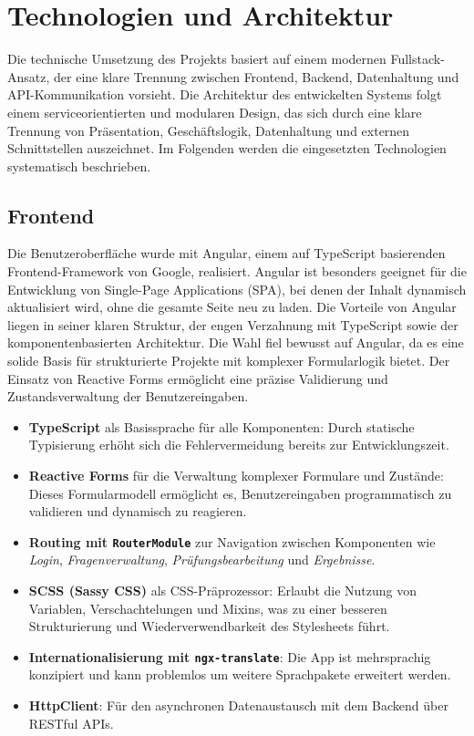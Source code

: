 \documentclass[a4paper,12pt]{article}
\begin{document}
\newpage

\section{Technologien und Architektur}
Die technische Umsetzung des Projekts basiert auf einem modernen Fullstack-Ansatz, der eine klare Trennung zwischen Frontend, Backend, Datenhaltung und API-Kommunikation vorsieht. Die Architektur des entwickelten Systems folgt einem serviceorientierten und modularen Design, das sich durch eine klare Trennung von Präsentation, Geschäftslogik, Datenhaltung und externen Schnittstellen auszeichnet. Im Folgenden werden die eingesetzten Technologien systematisch beschrieben.
\subsection{Frontend}
Die Benutzeroberfläche wurde mit Angular, einem auf TypeScript basierenden Frontend-Framework von Google, realisiert. Angular ist besonders geeignet für die Entwicklung von Single-Page Applications (SPA), bei denen der Inhalt dynamisch aktualisiert wird, ohne die gesamte Seite neu zu laden. Die Vorteile von Angular liegen in seiner klaren Struktur, der engen Verzahnung mit TypeScript sowie der komponentenbasierten Architektur. Die Wahl fiel bewusst auf Angular, da es eine solide Basis für strukturierte Projekte mit komplexer Formularlogik bietet. Der Einsatz von Reactive Forms ermöglicht eine präzise Validierung und Zustandsverwaltung der Benutzereingaben.


\begin{itemize}
    \item \textbf{TypeScript} als Basissprache für alle Komponenten: Durch statische Typisierung erhöht sich die Fehlervermeidung bereits zur Entwicklungszeit.
    
    \item \textbf{Reactive Forms} für die Verwaltung komplexer Formulare und Zustände: Dieses Formularmodell ermöglicht es, Benutzereingaben programmatisch zu validieren und dynamisch zu reagieren.
    
    \item \textbf{Routing mit \texttt{RouterModule}} zur Navigation zwischen Komponenten wie \textit{Login}, \textit{Fragenverwaltung}, \textit{Prüfungsbearbeitung} und \textit{Ergebnisse}.
    
    \item \textbf{SCSS (Sassy CSS)} als CSS-Präprozessor: Erlaubt die Nutzung von Variablen, Verschachtelungen und Mixins, was zu einer besseren Strukturierung und Wiederverwendbarkeit des Stylesheets führt.
    
    \item \textbf{Internationalisierung mit \texttt{ngx-translate}}: Die App ist mehrsprachig konzipiert und kann problemlos um weitere Sprachpakete erweitert werden.
    
    \item \textbf{HttpClient}: Für den asynchronen Datenaustausch mit dem Backend über RESTful APIs.
\end{itemize}
\end{document}
